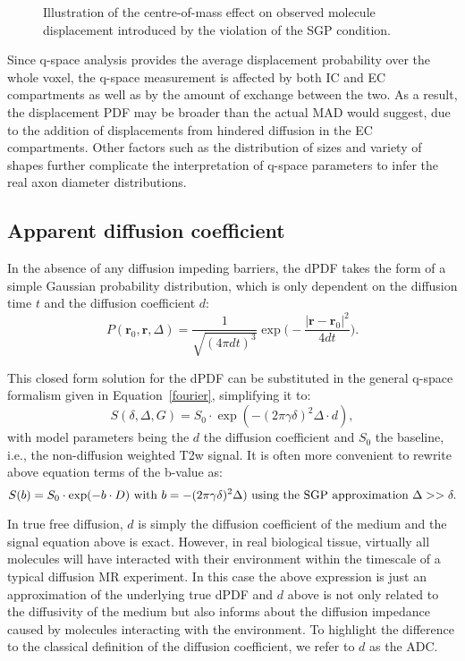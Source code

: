 \begin{figure}
 \centering
 \caption{Illustration of the centre-of-mass effect on observed molecule displacement introduced by the violation of the SGP condition.}
 \label{fig:chapter 2 COM}
\end{figure}


Since q-space analysis provides the average displacement probability over the whole voxel, the q-space measurement is affected by both IC and EC compartments as well as by the amount of exchange between the two. As a result, the displacement PDF may be broader than the actual MAD would suggest, due to the addition of displacements from hindered diffusion in the EC compartments. Other factors such as the distribution of sizes and variety of shapes further complicate the interpretation of q-space parameters to infer the real axon diameter distributions. 

\subsection{Apparent diffusion coefficient}
\label{subsec:adc}
In the absence of any diffusion impeding barriers, the dPDF takes the form of a simple Gaussian probability distribution, which is only dependent on the diffusion time $t$ and the diffusion coefficient $d$:
\begin{equation}
P(\textbf{r}_{0},\textbf{r},\Delta) =  \frac{1}{\sqrt{(4\pi dt)^3}}\exp\bigg(-\frac{|\textbf{r}-\textbf{r}_{0}|^{2}}{4dt}\bigg).
\label{Gaussian PDF}
\end{equation}

This closed form solution for the dPDF can be substituted in the general q-space formalism given in Equation~\ref{fourier}, simplifying it to:
\begin{equation}
	S(\delta,\Delta,G) = S_0 \cdot \exp(-(2\pi\gamma\delta)^2\Delta \cdot d),
\end{equation}
with model parameters being the $d$ the diffusion coefficient and $S_0$ the baseline, i.e., the non-diffusion weighted T2w signal. It is often more convenient to rewrite above equation terms of the b-value as: 
\begin{equation}
	S(b) = S_0 \cdot \exp(-b \cdot D)\\
		\mbox{ with } b = -(2\pi\gamma\delta)^2\Delta) \mbox{ using the SGP approximation } \Delta >> \delta.
\end{equation}

In true free diffusion, $d$ is simply the diffusion coefficient of the medium and the signal equation above is exact. However, in real biological tissue, virtually all molecules will have interacted with their environment within the timescale of a typical diffusion MR experiment. In this case the above expression is just an approximation of the underlying true dPDF and $d$ above is not only related to the diffusivity of the medium but also informs about the diffusion impedance caused by molecules interacting with the environment. To highlight the difference to the classical definition of the diffusion coefficient, we refer to $d$ as the \gls{ADC}.

